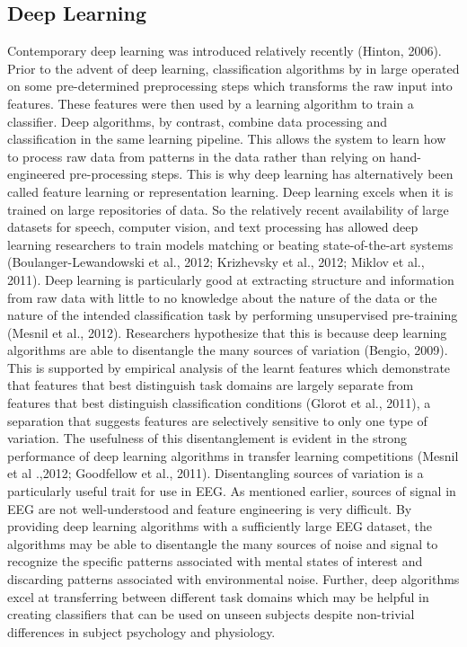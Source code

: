\documentclass{article} %
\begin{document}
\subsection{Deep Learning}
Contemporary deep learning was introduced relatively recently (Hinton, 2006). Prior to the advent of deep learning, classification algorithms by in large operated on some pre-determined preprocessing steps which transforms the raw input into features. These features were then used by a learning algorithm to train a classifier. Deep algorithms, by contrast, combine data processing and classification in the same learning pipeline. This allows the system to learn how to process raw data from
patterns in the data rather than relying on hand-engineered pre-processing steps. This is why deep learning has alternatively been called feature learning or representation learning.
Deep learning excels when it is trained on large repositories of data. So the relatively recent availability of large datasets for speech, computer vision, and text processing has allowed deep learning researchers to train models matching or beating state-of-the-art systems (Boulanger-Lewandowski et al., 2012; Krizhevsky et al., 2012; Miklov et al., 2011).  Deep learning is particularly good at extracting structure and information from raw data with little to no knowledge about the
nature of the data or the nature of the intended classification task by performing unsupervised pre-training (Mesnil et al., 2012). Researchers hypothesize that this is because deep learning algorithms are able to disentangle the many sources of variation (Bengio, 2009).  This is supported by empirical analysis of the learnt features which demonstrate that features that best distinguish task domains are largely separate from features that best distinguish classification conditions (Glorot et
al., 2011), a separation that suggests features are selectively sensitive to only one type of variation.  The usefulness of this disentanglement is evident in the strong performance of deep learning algorithms in transfer learning competitions (Mesnil et al .,2012; Goodfellow et al., 2011).
Disentangling sources of variation is a particularly useful trait for use in EEG. As mentioned earlier, sources of signal in EEG are not well-understood and feature engineering is very difficult. By providing deep learning algorithms with a sufficiently large EEG dataset, the algorithms may be able to disentangle the many sources of noise and signal to recognize the specific patterns associated with mental states of interest and discarding patterns associated with environmental noise.
Further, deep algorithms excel at transferring between different task domains which may be helpful in creating classifiers that can be used on unseen subjects despite non-trivial differences in subject psychology and physiology.
\end{document}

